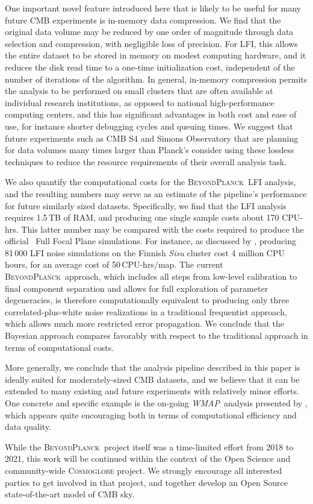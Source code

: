 \documentclass[twocolumn]{aa}
\def\WMAP{\emph{WMAP}}
\newcommand{\BP}{\textsc{BeyondPlanck}}
\begin{document}
One important novel feature introduced here that is likely to be
useful for many future CMB experiments is in-memory data
compression. We find that the original data volume may be reduced by
one order of magnitude through data selection and compression, with
negligible loss of precision. For LFI, this allows the entire dataset
to be stored in memory on modest computing hardware, and it reduces
the disk read time to a one-time initialization cost, independent of
the number of iterations of the algorithm. In general, in-memory
compression permits the analysis to be performed on small clusters
that are often available at individual research institutions, as
opposed to national high-performance computing centers, and this has
significant advantages in both cost and ease of use, for instance
shorter debugging cycles and queuing times. We suggest that future
experiments such as CMB S4 and Simons Observatory that are planning for data
volumes many times larger than Planck's consider using these lossless
techniques to reduce the resource requirements of their overall
analysis task.

We also quantify the computational costs for the \BP\ LFI analysis,
and the resulting numbers may serve as an estimate of the pipeline's
performance for future similarly sized datasets. Specifically, we find
that the LFI analysis requires 1.5\,TB of RAM, and producing one
single sample costs about 170 CPU-hrs. This latter number may be
compared with the costs required to produce the official \Planck\ Full
Focal Plane simulations. For instance, as discussed by
\citet{planck2014-a14}, producing 81\,000 LFI noise simulations on the
Finnish \emph{Sisu} cluster cost 4 million CPU hours, for an average
cost of 50\,CPU-hrs/map. The current \BP\ approach, which includes all
steps from low-level calibration to final component separation and
allows for full exploration of parameter degeneracies, is therefore
computationally equivalent to producing only three
correlated-plus-white noise realizations in a traditional frequentist
approach, which allows much more restricted error propagation. We
conclude that the Bayesian approach compares favorably with respect to
the traditional approach in terms of computational costs.

More generally, we conclude that the analysis pipeline described in
this paper is ideally suited for moderately-sized CMB datasets, and we
believe that it can be extended to many existing and future
experiments with relatively minor efforts. One concrete and specific
example is the on-going \WMAP\ analysis presented by \citet{BP17},
which appears quite encouraging both in terms of computational
efficiency and data quality.

While the \BP\ project itself was a time-limited effort from 2018 to
2021, this work will be continued within the context of the Open
Science and community-wide \textsc{Cosmoglobe} project. We strongly
encourage all interested parties to get involved in that project, and
together develop an Open Source state-of-the-art model of CMB sky.







\end{document}

